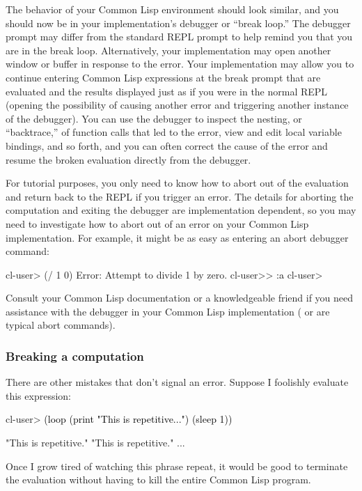 \documentclass[10pt,twoside,english,pdftex]{article}
\begin{document}
The behavior of your Common Lisp environment should look similar, and you
should now be in your implementation's debugger or ``break loop.''  The
debugger prompt may differ from the standard REPL prompt to help remind you
that you are in the break loop.  Alternatively, your implementation may open
another window or buffer in response to the error.  Your implementation may
allow you to continue entering Common Lisp expressions at the break prompt
that are evaluated and the results displayed just as if you were in the normal
REPL (opening the possibility of causing another error and triggering another
instance of the debugger).  You can use the debugger to inspect the nesting,
or ``backtrace,'' of function calls that led to the error, view and edit local
variable bindings, and so forth, and you can often correct the cause of the
error and resume the broken evaluation directly from the debugger.

For tutorial purposes, you only need to know how to abort out of the
evaluation and return back to the REPL if you trigger an error.  The details
for aborting the computation and exiting the debugger are implementation
dependent, so you may need to investigate how to abort out of an error on your
Common Lisp implementation.  For example, it might be as easy as entering an
abort debugger command:
%
\W\supp
\begin{example}
\textcolor{darkergray}{%
  cl-user> (/ 1 0)
  Error: Attempt to divide 1 by zero.
  cl-user>> \textcolor{black}{:a}
  cl-user>}
\end{example}
%
Consult your Common Lisp documentation or a knowledgeable friend if
you need assistance with the debugger in your Common Lisp
implementation ( or  are typical abort commands).

\subsubsection*{Breaking a computation}

There are other mistakes that don't signal an error.  Suppose I
foolishly evaluate this expression:
%
\W\supp
\begin{example}
\textcolor{darkergray}{%
  cl-user> \textcolor{black}{(loop (print "This is repetitive...") (sleep 1))}

  "This is repetitive." 
  "This is repetitive." 
       ...}
\end{example}
%
Once I grow tired of watching this phrase repeat, it would be good to
terminate the evaluation without having to kill the entire Common Lisp
program.
\end{document}
